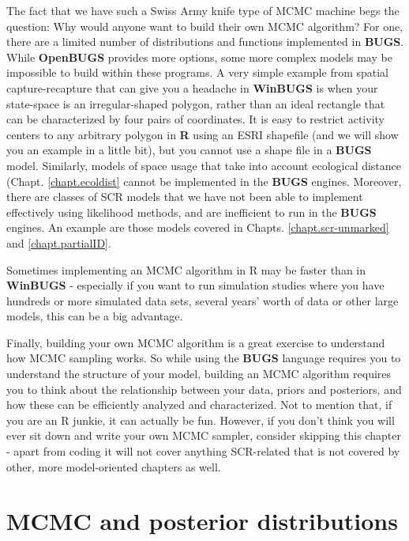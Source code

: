 The fact that we have such a Swiss Army knife type of MCMC machine
begs the question: Why would anyone want to build their own MCMC
algorithm? For one, there are a limited number of distributions and
functions implemented in {\bf BUGS}. While {\bf OpenBUGS} provides more
options, some more complex models may be impossible to build within
these programs. A very simple example from spatial capture-recapture
that can give you a headache in {\bf WinBUGS} is when your state-space is an
irregular-shaped polygon, rather than an ideal rectangle that can be
characterized by four pairs of coordinates. It is easy to restrict
activity centers to any arbitrary polygon in {\bf R} using an ESRI shapefile
(and we will show you an example in a little bit), but you cannot use
a shape file in a {\bf BUGS} model.  Similarly, models of space usage
that take into account ecological distance
(Chapt. \ref{chapt.ecoldist} cannot be implemented in the {\bf BUGS}
engines.  Moreover, there are classes of 
SCR models that we have not been able to implement effectively using
likelihood methods, and are inefficient to run in the {\bf BUGS}
engines. An example are those models covered in Chapts. 
\ref{chapt.scr-unmarked} and \ref{chapt.partialID}. 

Sometimes implementing an MCMC algorithm in R may be faster than in
{\bf WinBUGS} - especially if you want to run simulation studies where you
have hundreds or more simulated data sets, several years' worth of
data or other large models, this can be a big advantage.

Finally, building your own MCMC algorithm is a great exercise to
understand how MCMC sampling works. So while using the {\bf BUGS} language requires you to understand the structure of your model, building an MCMC algorithm requires you to think about the relationship between your data, priors and posteriors, and how these can be efficiently analyzed and characterized. Not to mention that, if you are an R junkie, it can actually be fun.
However, if you don't think you will ever sit down and write your own
MCMC sampler, consider skipping this chapter - apart from coding it
will not cover anything SCR-related that is not covered by other, more
model-oriented chapters as well.


\section{MCMC and posterior distributions}

